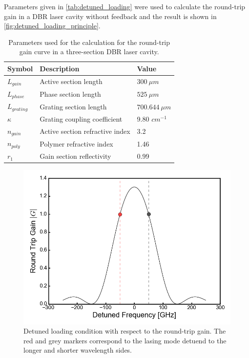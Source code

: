 Parameters given in \autoref{tab:detuned_loading} were used to calculate the round-trip gain in a DBR laser cavity without feedback and the result is shown in \autoref{fig:detuned_loading_principle}.

\begin{table}[ht]
    \centering
    \caption{Parameters used for the calculation for the round-trip gain curve in a three-section DBR laser cavity.}
    \label{tab:detuned_loading}
    \begin{tabular}{@{}lll@{}}
    \toprule
    Symbol        & Description                         & Value            \\ \midrule
    $L_{gain}$    & Active section length               & $300 \ \mu m$    \\
    $L_{phase}$   & Phase section length                & $525 \ \mu m$    \\
    $L_{grating}$ & Grating section length              & $700.644\ \mu m$ \\
    $\kappa$      & Grating coupling coefficient        & 9.80 $cm^{-1}$   \\
    $n_{gain}$      & Active section refractive index  & 3.2               \\
    $n_{poly}$    & Polymer refractive index            & 1.46             \\
    $r_1$         & Gain section  reflectivity          & 0.99             \\ \bottomrule
    \end{tabular}
\end{table}

\begin{figure}[H]
    \centering
    \includegraphics[width=.7\linewidth]{figures/detuned_loading_principle.png}
    \caption{Detuned loading condition with respect to the round-trip gain. The red and grey markers correspond to the lasing mode detuend to the longer and shorter wavelength sides.}
    \label{fig:detuned_loading_principle}
\end{figure}

